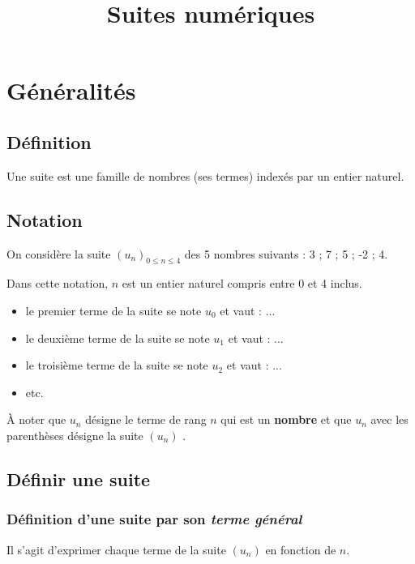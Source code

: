 \documentclass[a4paper,12pt]{scrartcl}
\title{Suites numériques}
\date{}
\begin{document}
\maketitle

\tableofcontents

\section{Généralités}

\subsection{Définition}

Une suite est une famille de nombres (ses termes) indexés par un entier naturel.

\subsection{Notation}

On considère la suite $\left( u_n \right)_{0 \leqslant n \leqslant 4}$ des 5 nombres suivants : 3 ; 7 ; 5 ; -2 ; 4.

Dans cette notation, $n$ est un entier naturel compris entre 0 et 4 inclus.

\begin{itemize}
\item le premier terme de la suite se note $u_0$ et vaut : ...
\item le deuxième terme de la suite se note $u_1$ et vaut : ...
\item le troisième terme de la suite se note $u_2$ et vaut : ...
\item etc.
\end{itemize}

À noter que $u_n$ désigne \og le terme de rang $n$ \fg{} qui est un \textbf{nombre} et que $u_n$ avec les parenthèses désigne \og la suite $(u_n)$ \fg{}.

\subsection{Définir une suite}

\subsubsection{Définition d'une suite par son \emph{terme général}}

Il s'agit d'exprimer chaque terme de la suite $\left( u_n \right)$ en fonction de $n$. 
\end{document}
